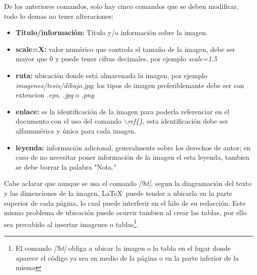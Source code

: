 De los anteriores comandos, solo hay cinco comandos que se deben modificar, todo lo demas no tener alteraciones:
\begin{itemize}
    \item \textbf{Titulo/información: } Título y/o información sobre la imagen.
    \item \textbf{scale=X: } valor numérico que controla el tamaño de la imagen, debe ser mayor que 0 y puede tener cifras decimales, por ejemplo \emph{scale=1.5} 
    \item \textbf{ruta: } ubicación donde está almacenada la imagen, por ejemplo \emph{imagenes/tesis/dibujo.jpg}; los tipos de imagen preferiblemante debe ser con extencion \emph{.eps}, \emph{.jpg} o \emph{.png}
    \item \textbf{enlace: } es la identificación de la imagen para poderla referenciar en el documento con el uso del comando $\backslash$\emph{ref\{\}}, esta identificación debe ser alfanumérica y única para cada imagen.
    \item \textbf{leyenda: } información adicional, generalmente sobre los derechos de autor; en caso de no necesitar poner información de la imagen el esta leyenda, tambien se debe borrar la palabra "Nota."
\end{itemize}

Cabe aclarar que aunque se usa el comando \emph{[!ht]}, segun la diagramación del texto y las dimenciones de la imagen, \LaTeX\ puede tender a ubicarla en la parte superior de cada página, lo cual puede interferir en el hilo de su redacción. Este mismo problema de ubicación puede ocurrir tambien al crear las tablas, por ello sea precabido al insertar imagenes o tablas\footnote{El comando \emph{[!ht]} obliga a ubicar la imagen o la tabla en el lugar donde aparece el código ya sea en medio de la página o en la parte inferior de la misma}.